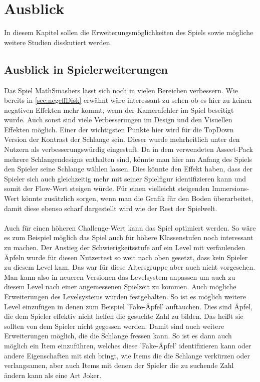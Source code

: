 \section{Ausblick}
\label{sec:ausblickDisk}
In diesem Kapitel sollen die Erweiterungsmöglichkeiten des Spiels sowie mögliche weitere Studien disskutiert werden.
\subsection{Ausblick in Spielerweiterungen}
Das Spiel MathSmashers lässt sich noch in vielen Bereichen verbessern. Wie bereits in \ref{sec:negeffDisk} erwähnt wäre interessant zu sehen ob es hier zu keinen negativen Effekten mehr kommt, wenn der Kamerafehler im Spiel beseitigt wurde. Auch sonst sind viele Verbesserungen im Design und den Visuellen Effekten möglich. Einer der wichtigsten Punkte hier wird für die TopDown Version der Kontrast der Schlange sein. Dieser wurde mehrheitlich unter den Nutzern als verbesserungswürdig eingestuft. Da in dem verwendeten Asseet-Pack mehrere Schlangendesigns enthalten sind, könnte man hier am Anfang des Spiels den Spieler seine Schlange wählen lassen. Dies könnte den Effekt haben, dass der Spieler sich auch gleichzeitig mehr mit seiner Spielfigur identifizieren kann und somit der Flow-Wert steigen würde. Für einen vielleicht steigenden Immersions-Wert könnte zusätzlich sorgen, wenn man die Grafik für den Boden überarbeitet, damit diese ebenso scharf dargestellt wird wie der Rest der Spielwelt.\\
\\
Auch für einen höheren Challenge-Wert kann das Spiel optimiert werden. So wäre es zum Beispiel möglich das Spiel auch für höhere Klassenstufen noch interessant zu machen. Der Anstieg der Schwierigkeitsstufe auf ein Level mit verfaulenden Äpfeln wurde für diesen Nutzertest so weit nach oben gesetzt, dass kein Spieler zu diesem Level kam. Das war für diese Altersgruppe aber auch nicht vorgesehen. Man kann also in neueren Versionen das Levelsystem anpassen um auch zu diesem Level nach einer angemessenen Spielzeit zu kommen. Auch mögliche Erweiterungen des Levelsystems wurden festgehalten. So ist es möglich weitere Level einzufügen in denen zum Beispiel 'Fake-Äpfel' auftauchen. Dies sind Äpfel, die dem Spieler effektiv nicht helfen die gesuchte Zahl zu bilden. Das heißt sie sollten von dem Spieler nicht gegessen werden. Damit sind auch weitere Erweiterungen möglich, die die Schlange fressen kann. So ist es dann auch möglich ein Item einzuführen, welches diese 'Fake-Äpfel' identifizieren kann oder andere Eigenschaften mit sich bringt, wie Items die die Schlange verkürzen oder verlangsamen, aber auch Items mit denen der Spieler die zu suchende Zahl ändern kann als eine Art Joker.

